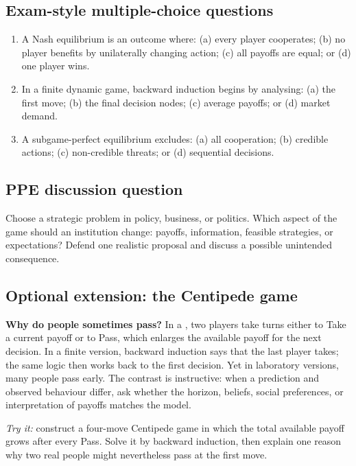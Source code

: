 \subsection*{Exam-style multiple-choice questions}
\begin{enumerate}[resume,label=\arabic*.]
  \item A Nash equilibrium is an outcome where: (a) every player cooperates; (b) no player benefits by unilaterally changing action; (c) all payoffs are equal; or (d) one player wins.
  \item In a finite dynamic game, backward induction begins by analysing: (a) the first move; (b) the final decision nodes; (c) average payoffs; or (d) market demand.
  \item A subgame-perfect equilibrium excludes: (a) all cooperation; (b) credible actions; (c) non-credible threats; or (d) sequential decisions.
\end{enumerate}

\subsection*{PPE discussion question}

\noindent Choose a strategic problem in policy, business, or politics. Which
aspect of the game should an institution change: payoffs, information, feasible
strategies, or expectations? Defend one realistic proposal and discuss a
possible unintended consequence.

\subsection*{Optional extension: the Centipede game}

\begin{exercisebox}
\textbf{Why do people sometimes pass?}
In a , two players take turns either to Take a current
payoff or to Pass, which enlarges the available payoff for the next decision.
In a finite version, backward induction says that the last player takes; the
same logic then works back to the first decision. Yet in laboratory versions,
many people pass early. The contrast is instructive: when a prediction and
observed behaviour differ, ask whether the horizon, beliefs, social
preferences, or interpretation of payoffs matches the model.

\smallskip
\textit{Try it:} construct a four-move Centipede game in which the total
available payoff grows after every Pass. Solve it by backward induction, then
explain one reason why two real people might nevertheless pass at the first
move.
\end{exercisebox}
